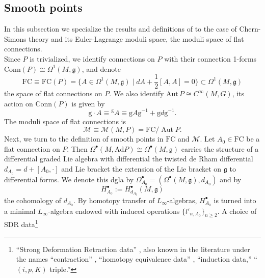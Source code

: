 \documentclass[11pt,a4paper]{amsart}
\theoremstyle{plain} %
\theoremstyle{definition}
\theoremstyle{remark}
\newcommand{\g}{\mathfrak{g}}
\newcommand{\dd}{d}
\newcommand{\Aut}{\operatorname{Aut}}
\newcommand{\mr}{\mathrm}
\newcommand{\M}{\mathcal{M}}
\newcommand{\FC}{\mathrm{FC}}
\newcommand{\sfg}{\mathrm{g}} %
\begin{document}
\subsection{Smooth points}
In this subsection we specialize the results and definitions of \cite[Appendix C]{Cattaneo2014} to the case of Chern-Simons theory and its Euler-Lagrange moduli space, the moduli space of flat connections. \\
 Since $P$ is trivialized, we identify connections on $P$ with their connection 1-forms $\mr{Conn}(P) \cong \Omega^1(M,\g)$, and denote 
\begin{equation}
    \FC \equiv \FC(P) = \{A \in \Omega^1(M,\g) \;|\; \dd A + \frac{1}{2}[A,A] = 0 \} \subset \Omega^1(M,\g)
\end{equation}
the space of flat connections on $P$.
We also identify $\mr{Aut}\,P \cong C^\infty(M,G)$, its action on $\mr{Conn}(P)$ is given by 
$$ \sfg\cdot A \equiv {}^\sfg A \equiv \sfg A\sfg^{-1} + \sfg d \sfg^{-1}.$$
The moduli space of flat connections is 
\begin{equation}
    \M \equiv \M(M,P) = \FC/\Aut P.
\end{equation}
Next, we turn to the definition of smooth points in $\FC$ and $\M$. 
Let $A_0 \in \FC$ be a flat connection on $P$. Then %
$\Omega^\bullet(M,\mr{Ad}P) \cong \Omega^\bullet(M,\g)$ carries the structure of a differential graded Lie algebra with differential the twisted de Rham differential $\dd_{A_0} = \dd + [A_0,\cdot]$ and Lie bracket the extension of the Lie bracket on $\g$ to differential forms. 
We denote this dgla by $\Omega^\bullet_{A_0} = (\Omega^\bullet(M,\g), \dd_{A_0})$ and by
$$ H^\bullet_{A_0} := H^\bullet_{\dd_{A_0}}(M,\g)$$
the cohomology of $\dd_{A_0}$. By homotopy transfer of $L_\infty$-algebras, $H^\bullet_{A_0}$ is turned into a minimal $L_\infty$-algebra endowed with induced operations $\{l'_{n,A_0}\}_{n\geq 2}$. A choice of %
SDR data\footnote{``Strong Deformation Retraction data'' \cite{gugenheim1989perturbation}, also known in the literature under the names ``contraction'' \cite{eilenberg1953groups}, ``homotopy equivalence data'' \cite{Crainic2004}, ``induction data,'' ``$(i,p,K)$ triple.''} 
\end{document}
